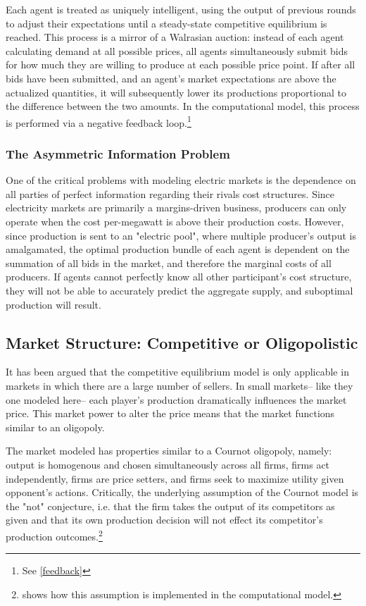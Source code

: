\documentclass[12pt]{article}
\begin{document}
Each agent is treated as uniquely intelligent, using the output of previous rounds to adjust their expectations until a steady-state competitive equilibrium is reached. This process is a mirror of a Walrasian auction: instead of each agent calculating demand at all possible prices, all agents simultaneously submit bids for how much they are willing to produce at each possible price point. If after all bids have been submitted, and an agent's market expectations are above the actualized quantities, it will subsequently lower its productions proportional to the difference between the two amounts. In the computational model, this process is performed via a negative feedback loop.\footnote{See \cref{feedback}}\*


\subsubsection{The Asymmetric Information Problem}\label{asymmetry}
One of the critical problems with modeling electric markets is the dependence on all parties of perfect information regarding their rivals cost structures. Since electricity markets are primarily a margins-driven business, producers can only operate when the cost per-megawatt is above their production costs. However, since production is sent to an "electric pool", where multiple producer's output is amalgamated, the optimal production bundle of each agent is dependent on the summation of all bids in the market, and therefore the  marginal costs of all producers. If agents cannot perfectly know all other participant's cost structure, they will not be able to accurately predict the aggregate supply, and suboptimal production will result. 


\subsection{Market Structure: Competitive or Oligopolistic}
It has been argued that the competitive equilibrium model is only applicable in markets in which there are a large number of sellers. In small markets-- like they one modeled here-- each player's production dramatically influences the market price. This market power to alter the price means that the market functions similar to an oligopoly.\*

The market modeled has properties similar to a Cournot oligopoly, namely: output is homogenous and chosen simultaneously across all firms, firms act independently, firms are price setters, and firms seek to maximize utility given opponent's actions. Critically, the underlying assumption of the Cournot model is the "not" conjecture, i.e. that the firm takes the output of its competitors as given and that its own production decision will not effect its competitor's production outcomes.\footnote{ shows how this assumption is implemented in the computational model.} \*
\end{document}
